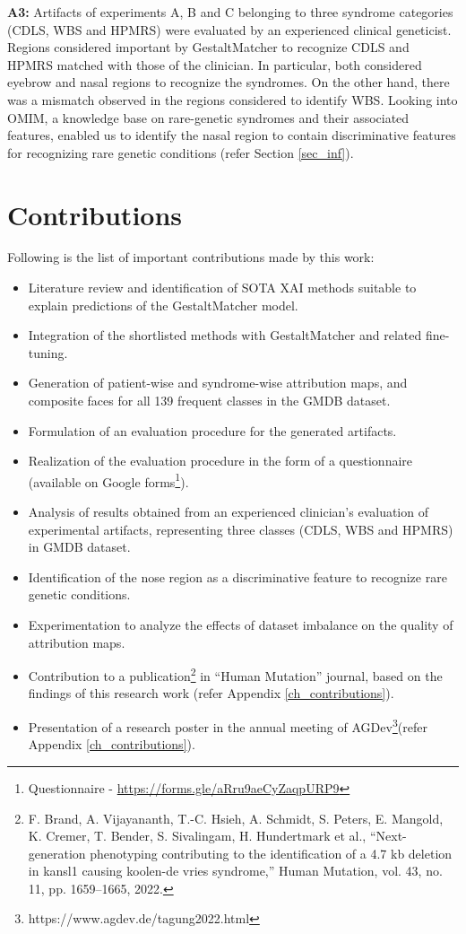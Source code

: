 \documentclass[../report.tex]{subfiles}
\begin{document}
	\textbf{A3:} Artifacts of experiments A, B and C belonging to three syndrome categories (CDLS, WBS and HPMRS) were evaluated by an experienced clinical geneticist. Regions considered important by GestaltMatcher to recognize CDLS and HPMRS matched with those of the clinician. In particular, both considered eyebrow and nasal regions to recognize the syndromes. On the other hand, there was a mismatch observed in the regions considered to identify WBS. Looking into OMIM, a knowledge base on rare-genetic syndromes and their associated features, enabled us to identify the nasal region to contain discriminative features for recognizing rare genetic conditions (refer Section \ref{sec_inf}).
	
    \section{Contributions}
	Following is the list of important contributions made by this work:
	\begin{itemize}
	\item Literature review and identification of SOTA XAI methods suitable to explain predictions of the GestaltMatcher model.
	\item Integration of the shortlisted methods with GestaltMatcher and related fine-tuning.
	\item Generation of patient-wise and syndrome-wise attribution maps, and composite faces for all 139 frequent classes in the GMDB dataset.
	\item Formulation of an evaluation procedure for the generated artifacts.
	\item Realization of the evaluation procedure in the form of a questionnaire (available on Google forms\footnote[1]{Questionnaire - \url{https://forms.gle/aRru9aeCyZaqpURP9}}).
	\item Analysis of results obtained from an experienced clinician's evaluation of experimental artifacts, representing three classes (CDLS, WBS and HPMRS) in GMDB dataset.
	\item Identification of the nose region as a discriminative feature to recognize rare genetic conditions.
	\item Experimentation to analyze the effects of dataset imbalance on the quality of attribution maps.
	\item Contribution to a publication\footnote[2]{F. Brand, A. Vijayananth, T.-C. Hsieh, A. Schmidt, S. Peters, E. Mangold, K. Cremer, T. Bender,
		S. Sivalingam, H. Hundertmark et al., “Next-generation phenotyping contributing to the identification
		of a 4.7 kb deletion in kansl1 causing koolen-de vries syndrome,” Human Mutation, vol. 43, no. 11,
		pp. 1659–1665, 2022.} in \enquote{Human Mutation} journal, based on the findings of this research work (refer Appendix \ref{ch_contributions}).
	\item Presentation of a research poster in the annual meeting of AGDev\footnote[3]{https://www.agdev.de/tagung2022.html}(refer Appendix \ref{ch_contributions}).
	\end{itemize}
\end{document}
